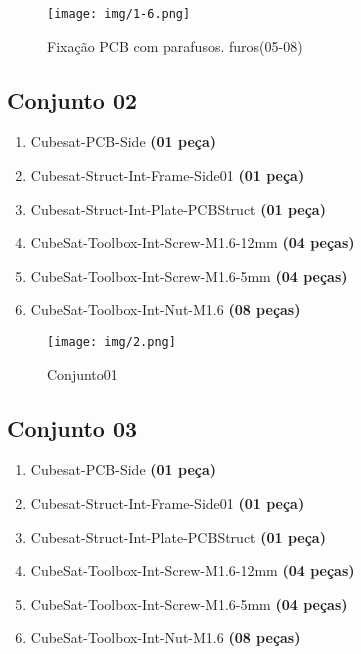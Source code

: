 \begin{figure}[ht!]
	\centering
	\texttt{[image: img/1-6.png]}
	\caption{Fixação PCB com parafusos. furos(05-08)}
	\label{1-6}
\end{figure}



\newpage
\subsection{Conjunto 02}\label{subs:c02}

\begin{enumerate}[label*=\ref*{subs:c02}\arabic*]
	\item Cubesat-PCB-Side \textbf{(01 peça)}
	\item Cubesat-Struct-Int-Frame-Side01 \textbf{(01 peça)}
	\item Cubesat-Struct-Int-Plate-PCBStruct \textbf{(01 peça)}
	\item CubeSat-Toolbox-Int-Screw-M1.6-12mm \textbf{(04 peças)}
	\item CubeSat-Toolbox-Int-Screw-M1.6-5mm \textbf{(04 peças)}
	\item CubeSat-Toolbox-Int-Nut-M1.6 \textbf{(08 peças)}
\end{enumerate}

\begin{figure}[ht!]
	\centering
	\texttt{[image: img/2.png]}
	\caption{Conjunto01}
	\label{2}
\end{figure}



\newpage
\subsection{Conjunto 03}\label{subs:c03}

\begin{enumerate}[label*=\ref*{subs:c03}\arabic*]
	\item Cubesat-PCB-Side \textbf{(01 peça)}
	\item Cubesat-Struct-Int-Frame-Side01 \textbf{(01 peça)}
	\item Cubesat-Struct-Int-Plate-PCBStruct \textbf{(01 peça)}
	\item CubeSat-Toolbox-Int-Screw-M1.6-12mm \textbf{(04 peças)}
	\item CubeSat-Toolbox-Int-Screw-M1.6-5mm \textbf{(04 peças)}
	\item CubeSat-Toolbox-Int-Nut-M1.6 \textbf{(08 peças)}
\end{enumerate}

